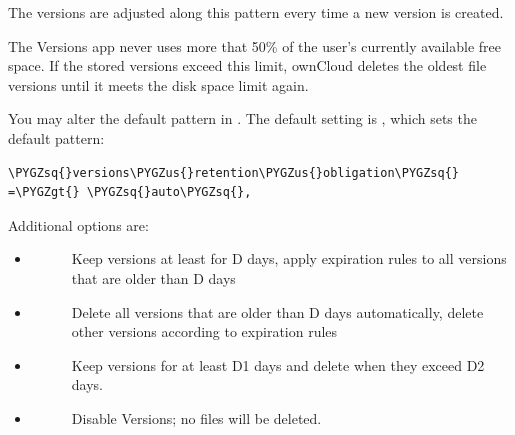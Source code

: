 \documentclass[letterpaper,10pt,english]{sphinxmanual}
\def\PYGZus{\char`\_}
\def\PYGZgt{\char`\>}
\def\PYGZsq{\char`\'}
\begin{document}
The versions are adjusted along this pattern every time a new version is
created.

The Versions app never uses more that 50\% of the user's currently available
free space. If the stored versions exceed this limit, ownCloud deletes the
oldest file versions until it meets the disk space limit again.

You may alter the default pattern in . The default setting is
, which sets the default pattern:

\begin{Verbatim}[commandchars=\\\{\}]
\PYGZsq{}versions\PYGZus{}retention\PYGZus{}obligation\PYGZsq{} =\PYGZgt{} \PYGZsq{}auto\PYGZsq{},
\end{Verbatim}

Additional options are:
\begin{itemize}
\item {} \begin{description}
\item[{}] \leavevmode
Keep versions at least for D days, apply expiration rules to all versions
that are older than D days

\end{description}

\item {} \begin{description}
\item[{}] \leavevmode
Delete all versions that are older than D days automatically, delete other
versions according to expiration rules

\end{description}

\item {} \begin{description}
\item[{}] \leavevmode
Keep versions for at least D1 days and delete when they exceed D2 days.

\end{description}

\item {} \begin{description}
\item[{}] \leavevmode
Disable Versions; no files will be deleted.

\end{description}

\end{itemize}
\end{document}
